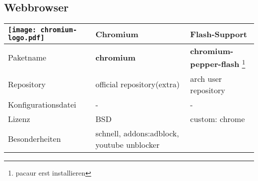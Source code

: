 \subsection{Webbrowser}
\begin{tabular}{l|l|l}
\texttt{[image: chromium-logo.pdf]} & Chromium & Flash-Support \\ \hline
    Paketname & \textbf{chromium} & \textbf{chromium-pepper-flash} \footnote{pacaur erst installieren} \\ 
Repository & official repository(extra) & arch user repository \\
Konfigurationsdatei & - & - \\
Lizenz & BSD & custom: chrome  \\
Besonderheiten & schnell, addons:adblock, youtube unblocker \\
\end{tabular}
